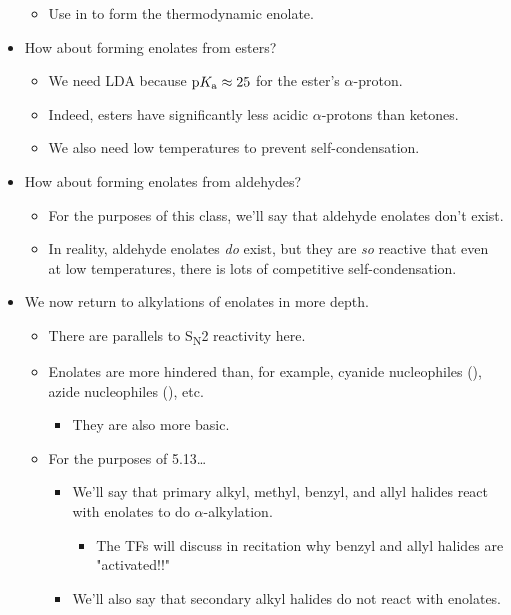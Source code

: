 \documentclass[../notes.tex]{subfiles}
\begin{document}
\begin{itemize}
\begin{itemize}
        \item Use  in  to form the thermodynamic enolate.
    \end{itemize}
    \item How about forming enolates from esters?
    \begin{itemize}
        \item We need LDA because $\textup{p}K_\textup{a}\approx 25$ for the ester's $\alpha$-proton.
        \item Indeed, esters have significantly less acidic $\alpha$-protons than ketones.
        \item We also need low temperatures to prevent self-condensation.
    \end{itemize}
    \item How about forming enolates from aldehydes?
    \begin{itemize}
        \item For the purposes of this class, we'll say that aldehyde enolates don't exist.
        \item In reality, aldehyde enolates \emph{do} exist, but they are \emph{so} reactive that even at low temperatures, there is lots of competitive self-condensation.
    \end{itemize}
    \item We now return to alkylations of enolates in more depth.
    \begin{itemize}
        \item There are parallels to S\textsubscript{N}2 reactivity here.
        \item Enolates are more hindered than, for example, cyanide nucleophiles (), azide nucleophiles (), etc.
        \begin{itemize}
            \item They are also more basic.
        \end{itemize}
        \item For the purposes of 5.13\dots
        \begin{itemize}
            \item We'll say that primary alkyl, methyl, benzyl, and allyl halides react with enolates to do $\alpha$-alkylation.
            \begin{itemize}
                \item The TFs will discuss in recitation why benzyl and allyl halides are "activated!!"
            \end{itemize}
            \item We'll also say that secondary alkyl halides do not react with enolates.

\end{itemize}
\end{itemize}
\end{itemize}
\end{document}
